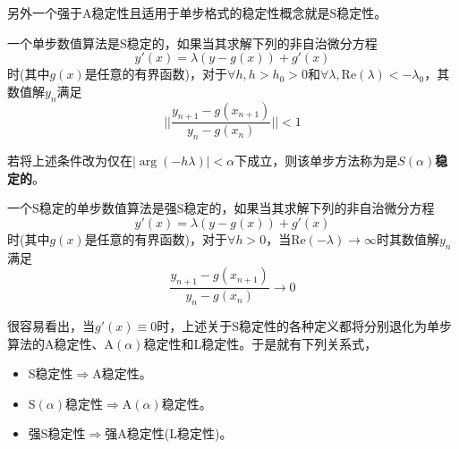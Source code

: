 另外一个强于A稳定性且适用于单步格式的稳定性概念就是S稳定性\cite{Prothero1974a}。
\begin{definition}[S稳定性]
一个单步数值算法是S稳定的\cite{Prothero1974a,Fatunla1988a}，如果当其求解下列的非自治微分方程
\begin{equation}
y'(x)=\lambda(y-g(x))+g'(x)
\end{equation}
时(其中$g(x)$是任意的有界函数)，对于$\forall h,h>h_0>0$和$\forall\lambda, \text{Re}(\lambda)<-\lambda_0$，其数值解$y_n$满足
\begin{equation}
||\frac{y_{n+1}-g(x_{n+1})}{y_n-g(x_n)}||<1
\end{equation}
\end{definition}
若将上述条件改为仅在$|\arg(-h\lambda)|<\alpha$下成立，则该单步方法称为是$S(\alpha)$\textbf{稳定的}\cite{Prothero1974a}。
\begin{definition}[强S稳定性]
一个S稳定的单步数值算法是强S稳定的\cite{Prothero1974a}，如果当其求解下列的非自治微分方程
\begin{equation}
y'(x)=\lambda(y-g(x))+g'(x)
\end{equation}
时(其中$g(x)$是任意的有界函数)，对于$\forall h>0$，当$\text{Re}(-\lambda)\to\infty$时其数值解$y_n$满足
\begin{equation}
\frac{y_{n+1}-g(x_{n+1})}{y_n-g(x_n)}\to0
\end{equation}
\end{definition}
很容易看出，当$g'(x)\equiv0$时，上述关于S稳定性的各种定义都将分别退化为单步算法的A稳定性、A$(\alpha)$稳定性和L稳定性。于是就有下列关系式，
\begin{itemize}
\item[\ddag] S稳定性$\Longrightarrow$A稳定性。
\item[\ddag] S$(\alpha)$稳定性$\Longrightarrow$A$(\alpha)$稳定性。
\item[\ddag] 强S稳定性$\Longrightarrow$强A稳定性(L稳定性)。
\end{itemize}


